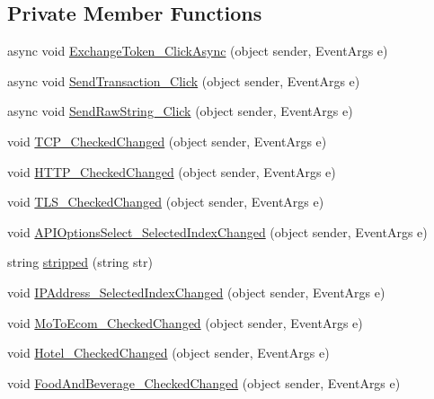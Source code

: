 \subsection*{Private Member Functions}
\begin{DoxyCompactItemize}
\item 
async void \mbox{\hyperlink{class_form_sim_1_1_form1_a93df121074a9d4a5d84028c88006cd85}{Exchange\+Token\+\_\+\+Click\+Async}} (object sender, Event\+Args e)
\item 
async void \mbox{\hyperlink{class_form_sim_1_1_form1_a87ca4036b1c618f3093430405aeba8e4}{Send\+Transaction\+\_\+\+Click}} (object sender, Event\+Args e)
\item 
async void \mbox{\hyperlink{class_form_sim_1_1_form1_a084c2aeea3986cecad18ff155bdcf787}{Send\+Raw\+String\+\_\+\+Click}} (object sender, Event\+Args e)
\item 
void \mbox{\hyperlink{class_form_sim_1_1_form1_ad4bb652b7d70981d588fea85202d8141}{T\+C\+P\+\_\+\+Checked\+Changed}} (object sender, Event\+Args e)
\item 
void \mbox{\hyperlink{class_form_sim_1_1_form1_aefa5468c4118286a2ce65347ffb6e549}{H\+T\+T\+P\+\_\+\+Checked\+Changed}} (object sender, Event\+Args e)
\item 
void \mbox{\hyperlink{class_form_sim_1_1_form1_a1faf00c6508c7dd62d5f163c87bc1a2b}{T\+L\+S\+\_\+\+Checked\+Changed}} (object sender, Event\+Args e)
\item 
void \mbox{\hyperlink{class_form_sim_1_1_form1_abef6d6522b35a19fc08da5f6817d6190}{A\+P\+I\+Options\+Select\+\_\+\+Selected\+Index\+Changed}} (object sender, Event\+Args e)
\item 
string \mbox{\hyperlink{class_form_sim_1_1_form1_adddcbdfa223d8d3eea3710278d6f4825}{stripped}} (string str)
\item 
void \mbox{\hyperlink{class_form_sim_1_1_form1_a6d85c1197b7f08d87e53b0e326ee4375}{I\+P\+Address\+\_\+\+Selected\+Index\+Changed}} (object sender, Event\+Args e)
\item 
void \mbox{\hyperlink{class_form_sim_1_1_form1_acace7bb65973370b2802f93a43495e1b}{Mo\+To\+Ecom\+\_\+\+Checked\+Changed}} (object sender, Event\+Args e)
\item 
void \mbox{\hyperlink{class_form_sim_1_1_form1_af0c2817f4ba09eb6c2fb0fe6bee2457d}{Hotel\+\_\+\+Checked\+Changed}} (object sender, Event\+Args e)
\item 
void \mbox{\hyperlink{class_form_sim_1_1_form1_a7c36bc29aa6d9fc704fcee5fc434973c}{Food\+And\+Beverage\+\_\+\+Checked\+Changed}} (object sender, Event\+Args e)

\end{DoxyCompactItemize}
